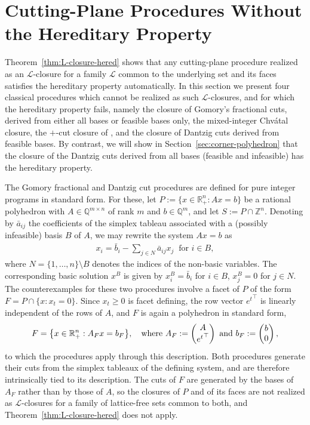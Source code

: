 \documentclass{article}
\newcommand{\Z}{\mathbb{Z}}
\newcommand{\R}{\mathbb{R}}
\newcommand{\Q}{\mathbb{Q}}
\renewcommand{\L}{\mathcal{L}}
\begin{document}
\section{Cutting-Plane Procedures Without the Hereditary Property} \label{sec:non-hered}

Theorem~\ref{thm:L-closure-hered} shows that any cutting-plane procedure realized as an $\L$-closure for a family $\L$ common to the underlying set and its faces satisfies the hereditary property automatically. In this section we present four classical procedures which cannot be realized as such $\L$-closures, and for which the hereditary property fails, namely the closure of Gomory's fractional cuts, derived from either all bases or feasible bases only, the mixed-integer Chv\'atal closure, the $+$-cut closure of \cite{pokutta2010rank}, and the closure of Dantzig cuts derived from feasible bases. By contrast, we will show in Section~\ref{sec:corner-polyhedron} that the closure of the Dantzig cuts derived from all bases (feasible and infeasible) has the hereditary property.

The Gomory fractional and Dantzig cut procedures are defined for pure integer programs in standard form. For these, let $P := \{x \in \R_+^n : Ax = b\}$ be a rational polyhedron with $A \in \Q^{m \times n}$ of rank $m$ and $b \in \Q^m$, and let $S := P \cap \Z^n$. Denoting by $\bar a_{ij}$ the coefficients of the simplex tableau associated with a (possibly infeasible) basis $B$ of $A$, we may rewrite the system $Ax = b$ as
\begin{align}
    x_i = \bar{b}_i - \sum_{j \in N} \bar{a}_{ij} x_j \ \text{ for } i \in B, \label{eq:tableau}
\end{align}
where $N = \{1,\ldots,n\} \setminus B$ denotes the indices of the non-basic variables. The corresponding basic solution $x^B$ is given by $x^B_i = \bar b_i$ for $i \in B$, $x^B_j = 0$ for $j \in N$. The counterexamples for these two procedures involve a facet of $P$ of the form $F = P \cap \{x : x_t = 0\}$. Since $x_t \geq 0$ is facet defining, the row vector ${e^t}^\top$ is linearly independent of the rows of $A$, and $F$ is again a polyhedron in standard form,
\begin{align}
    F = \bigl\{x \in \R_+^n : A_F x = b_F\bigr\}, \quad \text{where } A_F := \begin{pmatrix} A \\ {e^t}^\top \end{pmatrix} \text{ and } b_F := \begin{pmatrix} b \\ 0 \end{pmatrix}, \notag
\end{align}
to which the procedures apply through this description. Both procedures generate their cuts from the simplex tableaux of the defining system, and are therefore intrinsically tied to its description. The cuts of $F$ are generated by the bases of $A_F$ rather than by those of $A$, so the closures of $P$ and of its faces are not realized as $\L$-closures for a family of lattice-free sets common to both, and Theorem~\ref{thm:L-closure-hered} does not apply.
\end{document}
